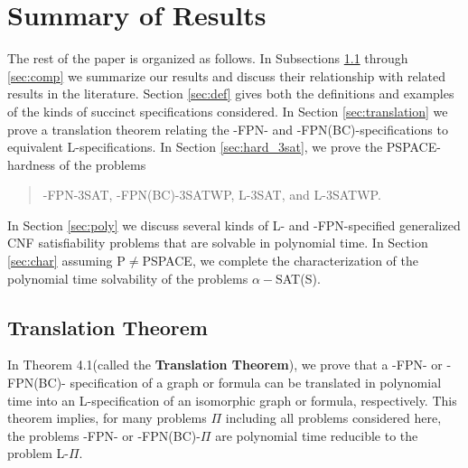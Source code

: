 \section{Summary of Results}
\label{sec:summary}

The rest of the paper is organized as follows.  In Subsections 
\ref{sec:trans} through \ref{sec:comp} 
we summarize our  results and discuss their relationship with related 
results in the literature. Section \ref{sec:def} gives both the 
definitions and examples of the kinds of  succinct 
specifications considered.
In Section \ref{sec:translation}
we  prove a translation theorem  relating the 
{-FPN-} and {-FPN(BC)-}specifications 
to equivalent {\sf L-}specifications. 
 In Section \ref{sec:hard_3sat},
we prove the {\sf PSPACE}-hardness of the problems
\begin{quote}
 {-FPN-3SAT}, {-FPN(BC)-3SATWP},  {\sf L-3SAT}, and
{\sf L-3SATWP}.
\end{quote}
In Section \ref{sec:poly} we discuss several kinds of  
{\sf L-} and {-FPN-}specified generalized {\sf CNF} 
 satisfiability problems that are solvable in 
polynomial time. In Section \ref{sec:char} assuming 
{\sf P}$\neq${\sf PSPACE}, we complete the 
characterization of the polynomial time solvability
of the problems $\alpha-${\sf SAT(S)}. 

 

\subsection{Translation Theorem}\label{sec:trans}
In Theorem 4.1(called the {\bf Translation Theorem}),
we prove that a {-FPN-} or {-FPN(BC)-} specification of a graph
or  formula can be translated in polynomial time into an
{\sf L}-specification of an isomorphic  graph or formula, respectively.
This theorem implies, for many problems
$\Pi$ including all problems considered here,  the problems 
{-FPN-} or {-FPN(BC)-}$\Pi$ are 
polynomial time reducible to  the problem {\sf L-}$\Pi$.

